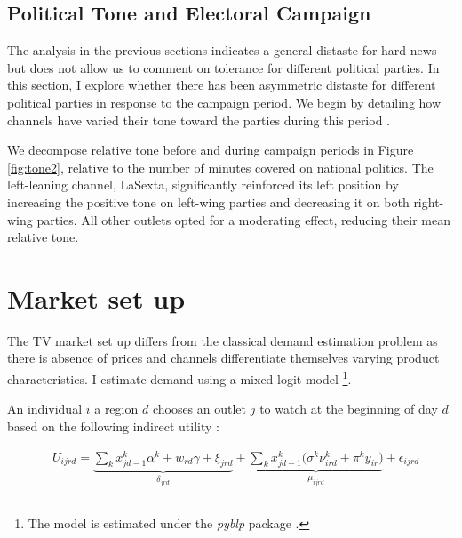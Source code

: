 \documentclass[12pt]{article}
\begin{document}
	\subsection{Political Tone and Electoral Campaign}
	
	The analysis in the previous sections indicates a general distaste for hard news but does not allow us to comment on tolerance for different political parties. In this section, I explore whether there has been asymmetric distaste for different political parties in response to the campaign period. We begin by detailing how channels have varied their tone toward the parties during this period \citep{independent2023vox}.
	
	We decompose relative tone before and during campaign periods in Figure \ref{fig:tone2}, relative to the number of minutes covered on national politics. The left-leaning channel, LaSexta, significantly reinforced its left position by increasing the positive tone on left-wing parties and decreasing it on both right-wing parties. All other outlets opted for a moderating effect, reducing their mean relative tone.
	
	
	
	
	
	\section{Market set up}\label{section:market}
	
	The TV market set up differs from the classical demand estimation problem as there is absence of prices and channels differentiate themselves varying product characteristics. I estimate demand using a mixed logit model \citep{berry1994estimating} \footnote{The model is estimated under the \textit{pyblp} package \citep{conlon2020best}.}.
	
	
	
	An individual $ i $  a region $d$ chooses an outlet $ j $ to watch at the beginning of day $d$ based on the following indirect utility : 
	
	
	\begin{equation}\label{eq:utility}
		\begin{aligned}
			& U_{ijrd}= \underbrace{\sum_k x_{jd-1}^k\alpha^k+w_{rd}\gamma  +  \xi_{jrd}}_{\delta_{jrd}}  + \underbrace{  \sum_k x_{jd-1}^k \Big( \sigma^k \nu_{ird}^k  + \pi^ky_{ir} \Big)}_{\mu_{ijrd}}+\epsilon_{ijrd} 
		\end{aligned}
	\end{equation} 
	
\end{document}
